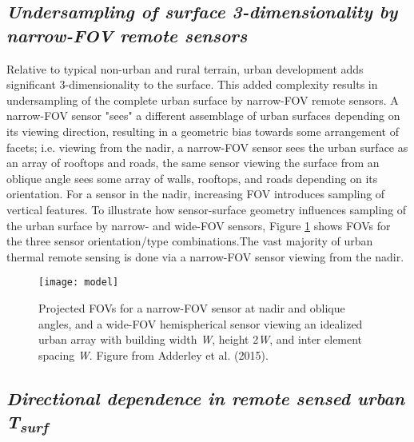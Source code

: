 \begin{bibunit}

\subsection*{\textnormal{\textit{Undersampling of surface 3-dimensionality by narrow-FOV remote sensors}}}

Relative to typical non-urban and rural terrain, urban development adds significant 3-dimensionality to the surface. This added complexity results in undersampling of the complete urban surface by narrow-FOV remote sensors. A narrow-FOV sensor "sees" a different assemblage of urban surfaces depending on its viewing direction, resulting in a geometric bias towards some arrangement of facets; i.e. viewing from the nadir, a narrow-FOV sensor sees the urban surface as an array of rooftops and roads, the same sensor viewing the surface from an oblique angle sees some array of walls, rooftops, and roads depending on its orientation. For a sensor in the nadir, increasing FOV introduces sampling of vertical features. To illustrate how sensor-surface geometry influences sampling of the urban surface by narrow- and wide-FOV sensors, Figure \ref{model} shows FOVs for the three sensor orientation/type combinations.The vast majority of urban thermal remote sensing is done via a narrow-FOV sensor viewing from the nadir.

\begin{figure}[H]
	\centering
	\texttt{[image: model]}
	\caption{Projected FOVs for a narrow-FOV sensor at nadir and oblique angles, and a wide-FOV hemispherical sensor viewing an idealized urban array with building width \textit{W}, height 2\textit{W}, and inter element spacing \textit{W}. Figure from Adderley et al. (2015).}
	\label{model}
\end{figure}

\subsection*{\textnormal{\textit{Directional dependence in remote sensed urban T\textsubscript{surf}}}}


\end{bibunit}
